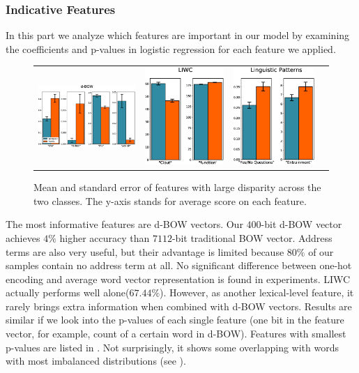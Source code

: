 \subsubsection*{Indicative Features}
In this part we analyze which features are important in our model by examining the coefficients 
and p-values in logistic regression for each feature we applied. 
\begin{figure}[h!]
	\centering
	\begin{tabular}{@{}cccc@{}}
		\includegraphics[width=.464\textwidth]{d-bow.eps} &
		\includegraphics[width=.24\textwidth]{liwc.eps} &
		\includegraphics[width=.248\textwidth]{lp.eps} 
	\end{tabular}
	\caption{Mean and standard error of features with large disparity
across the two classes. The y-axis stands for average score on each feature.} \label{fig:compare}
\end{figure}
The most informative features are d-BOW vectors. Our $400$-bit d-BOW vector achieves $4\%$ higher accuracy than $7112$-bit traditional BOW vector.
Address terms are also very useful,  
but their advantage is limited because $80\%$ of our samples contain 
no address term at all. No significant difference between one-hot encoding and average word vector representation is found in experiments.
LIWC actually performs well alone($67.44\%$). However, 
as another lexical-level feature, it rarely brings extra information 
when combined with d-BOW vectors. Results are similar 
if we look into the p-values of each single feature (one bit in 
the feature vector, for example, count of a certain word in d-BOW). 
Features with smallest p-values are listed in . Not surprisingly, it shows some overlapping with words with most imbalanced distributions (see ).

